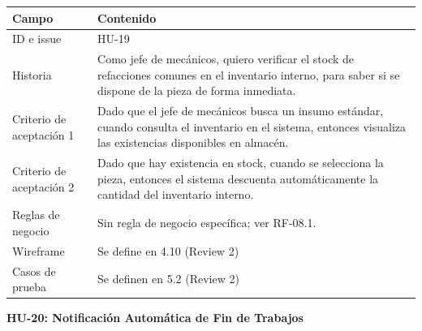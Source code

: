 {\def\LTcaptype{none} %
\begin{longtable}[]{@{}
  >{\raggedright\arraybackslash}p{}
  >{\raggedright\arraybackslash}p{}@{}}
\toprule\noalign{}
\begin{minipage}[b]{\linewidth}\raggedright
\textbf{Campo}
\end{minipage} & \begin{minipage}[b]{\linewidth}\raggedright
\textbf{Contenido}
\end{minipage} \\
\midrule\noalign{}
\endhead
\bottomrule\noalign{}
\endlastfoot
ID e issue & HU-19 \\
Historia & Como jefe de mecánicos, quiero verificar el stock de
refacciones comunes en el inventario interno, para saber si se dispone
de la pieza de forma inmediata. \\
Criterio de aceptación 1 & Dado que el jefe de mecánicos busca un insumo
estándar, cuando consulta el inventario en el sistema, entonces
visualiza las existencias disponibles en almacén. \\
Criterio de aceptación 2 & Dado que hay existencia en stock, cuando se
selecciona la pieza, entonces el sistema descuenta automáticamente la
cantidad del inventario interno. \\
Reglas de negocio & Sin regla de negocio específica; ver RF-08.1. \\
Wireframe & Se define en 4.10 (Review 2) \\
Casos de prueba & Se definen en 5.2 (Review 2) \\
\end{longtable}
}

\textbf{HU-20: Notificación Automática de Fin de Trabajos}

